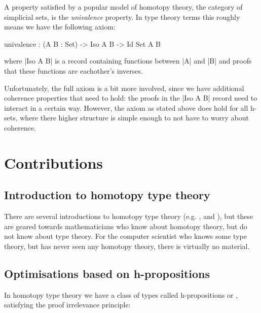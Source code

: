 A property satisfied by a popular model of homotopy theory, the
category of simplicial sets, is the \emph{univalence} property. In
type theory terms this roughly means we have the following axiom:

\begin{code}
  univalence : (A B : Set) -> Iso A B -> Id Set A B
\end{code}

where |Iso A B| is a record containing functions between |A| and |B|
and proofs that these functions are eachother's inverses.

Unfortunately, the full axiom is a bit more involved, since we have
additional coherence properties that need to hold: the proofs in the
|Iso A B| record need to interact in a certain way. However, the axiom
as stated above does hold for all h-sets, where there higher structure
is simple enough to not have to worry about coherence.

\section{Contributions}
\label{sec:contribs}


\subsection{Introduction to homotopy type theory}
\label{sec:contrib-hott-intro}


There are several introductions to homotopy type theory
(e.g. \cite{awodeysurvey}, \cite{pelayosurvey} and \cite{rijkehott}),
but these are geared towards mathematicians who know about homotopy
theory, but do not know about type theory. For the computer scientist
who knows some type theory, but has never seen any homotopy theory,
there is virtually no material.


\subsection{Optimisations based on h-propositions}
\label{sec:contrib-optimisation}


In homotopy type theory we have a class of types called h-propositions
or , satisfying the proof irrelevance principle:

